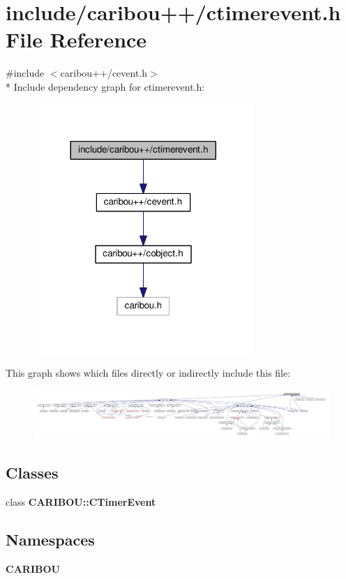 \section{include/caribou++/ctimerevent.h File Reference}
\label{ctimerevent_8h}
{\ttfamily \#include $<$caribou++/cevent.\+h$>$}\\*
Include dependency graph for ctimerevent.\+h\+:
\nopagebreak
\begin{figure}[H]
\begin{center}
\leavevmode
\includegraphics[width=236pt]{ctimerevent_8h__incl}
\end{center}
\end{figure}
This graph shows which files directly or indirectly include this file\+:
\nopagebreak
\begin{figure}[H]
\begin{center}
\leavevmode
\includegraphics[width=350pt]{ctimerevent_8h__dep__incl}
\end{center}
\end{figure}
\subsection*{Classes}
\begin{DoxyCompactItemize}
\item 
class {\bf C\+A\+R\+I\+B\+O\+U\+::\+C\+Timer\+Event}
\end{DoxyCompactItemize}
\subsection*{Namespaces}
\begin{DoxyCompactItemize}
\item 
 {\bf C\+A\+R\+I\+B\+OU}
\end{DoxyCompactItemize}
